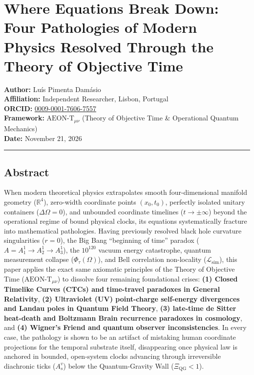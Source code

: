 \documentclass[
]{article}
\author{}
\date{}
\begin{document}
\section{Where Equations Break Down: Four Pathologies of Modern Physics
Resolved Through the Theory of Objective
Time}\label{where-equations-break-down-four-pathologies-of-modern-physics-resolved-through-the-theory-of-objective-time}

\textbf{Author:} Luís Pimenta Damásio\\
\textbf{Affiliation:} Independent Researcher, Lisbon, Portugal\\
\textbf{ORCID:}
\href{https://orcid.org/0009-0001-7606-7557}{0009-0001-7606-7557}\\
\textbf{Framework:} \(\text{AEON-T}_{\mu\nu}\) (Theory of Objective Time
\& Operational Quantum Mechanics)\\
\textbf{Date:} November 21, 2026

\begin{center}\rule{0.5\linewidth}{0.5pt}\end{center}

\subsection{Abstract}\label{abstract}

When modern theoretical physics extrapolates smooth four-dimensional
manifold geometry (\(\mathbb{R}^4\)), zero-width coordinate points
\((x_0, t_0)\), perfectly isolated unitary containers
(\(\Delta\Omega = 0\)), and unbounded coordinate timelines
(\(t \to \pm\infty\)) beyond the operational regime of bound physical
clocks, its equations systematically fracture into mathematical
pathologies. Having previously resolved black hole curvature
singularities (\(r = 0\)), the Big Bang ``beginning of time'' paradox
(\(A = A_1^1 \to A_2^1 \to A_3^1\)), the \(10^{120}\) vacuum energy
catastrophe, quantum measurement collapse (\(\Phi_\tau(\Omega)\)), and
Bell correlation non-locality (\(\mathcal{L}_{\mathrm{sim}}\)), this
paper applies the exact same axiomatic principles of the Theory of
Objective Time (\(\text{AEON-T}_{\mu\nu}\)) to dissolve four remaining
foundational crises: \textbf{(1) Closed Timelike Curves (CTCs) and
time-travel paradoxes in General Relativity}, \textbf{(2) Ultraviolet
(UV) point-charge self-energy divergences and Landau poles in Quantum
Field Theory}, \textbf{(3) late-time de Sitter heat-death and Boltzmann
Brain recurrence paradoxes in cosmology}, and \textbf{(4) Wigner's
Friend and quantum observer inconsistencies}. In every case, the
pathology is shown to be an artifact of mistaking human coordinate
projections for the temporal substrate itself, disappearing once
physical law is anchored in bounded, open-system clocks advancing
through irreversible diachronic ticks (\(A_s^v\)) below the
Quantum-Gravity Wall (\(\Xi_{\mathrm{QG}} < 1\)).
\end{document}
